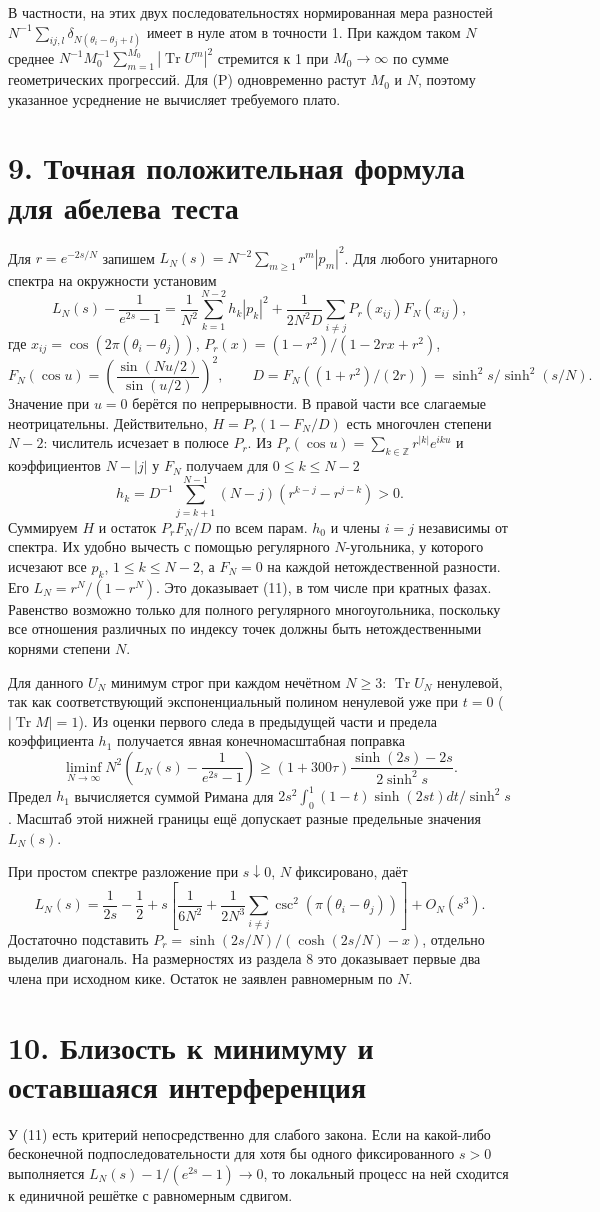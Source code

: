 \documentclass[11pt,a4paper]{article}
\newcommand{\Tr}{\operatorname{Tr}}
\newcommand{\Z}{\mathbb Z}
\newcommand{\sect}[1]{\section*{\sffamily\color{ink}#1}}
\begin{document}
В частности, на этих двух последовательностях нормированная мера разностей $N^{-1}\sum_{ij,l}\delta_{N(\theta_i-\theta_j+l)}$ имеет в нуле атом в точности 1. При каждом таком $N$ среднее $N^{-1}M_0^{-1}\sum_{m=1}^{M_0}|\Tr U^m|^2$ стремится к 1 при $M_0\to\infty$ по сумме геометрических прогрессий. Для (P) одновременно растут $M_0$ и $N$, поэтому указанное усреднение не вычисляет требуемого плато.
\newpage
\sect{9. Точная положительная формула для абелева теста}
Для $r=e^{-2s/N}$ запишем $L_N(s)=N^{-2}\sum_{m\ge1}r^m|p_m|^2$. Для любого унитарного спектра на окружности установим
\[
 L_N(s)-\frac1{e^{2s}-1}=\frac1{N^2}\sum_{k=1}^{N-2}h_k|p_k|^2
       +\frac1{2N^2D}\sum_{i\ne j}P_r(x_{ij})F_N(x_{ij}),                 \tag{11}
\]
где $x_{ij}=\cos(2\pi(\theta_i-\theta_j))$, $P_r(x)=(1-r^2)/(1-2rx+r^2)$,
\[
 F_N(\cos u)=\left(\frac{\sin(Nu/2)}{\sin(u/2)}\right)^2,\qquad
 D=F_N((1+r^2)/(2r))=\sinh^2 s/\sinh^2(s/N).
\]
Значение при $u=0$ берётся по непрерывности. В правой части все слагаемые неотрицательны. Действительно, $H=P_r(1-F_N/D)$ есть многочлен степени $N-2$: числитель исчезает в полюсе $P_r$. Из $P_r(\cos u)=\sum_{k\in\Z}r^{|k|}e^{iku}$ и коэффициентов $N-|j|$ у $F_N$ получаем для $0\le k\le N-2$
\[
       h_k=D^{-1}\sum_{j=k+1}^{N-1}(N-j)(r^{k-j}-r^{j-k})>0 .
\]
Суммируем $H$ и остаток $P_rF_N/D$ по всем парам. $h_0$ и члены $i=j$ независимы от спектра. Их удобно вычесть с помощью регулярного $N$-угольника, у которого исчезают все $p_k$, $1\le k\le N-2$, а $F_N=0$ на каждой нетождественной разности. Его $L_N=r^N/(1-r^N)$. Это доказывает (11), в том числе при кратных фазах. Равенство возможно только для полного регулярного многоугольника, поскольку все отношения различных по индексу точек должны быть нетождественными корнями степени $N$.

Для данного $U_N$ минимум строг при каждом нечётном $N\ge3$: $\Tr U_N$ ненулевой, так как соответствующий экспоненциальный полином ненулевой уже при $t=0$ ($|\Tr M|=1$). Из оценки первого следа в предыдущей части и предела коэффициента $h_1$ получается явная конечномасштабная поправка
\[
 \liminf_{N\to\infty} N^2\left(L_N(s)-\frac1{e^{2s}-1}\right)
 \ge (1+300\tau)\frac{\sinh(2s)-2s}{2\sinh^2s}.
\]
Предел $h_1$ вычисляется суммой Римана для $2s^2\int_0^1(1-t)\sinh(2st)dt/\sinh^2s$. Масштаб этой нижней границы ещё допускает разные предельные значения $L_N(s)$.

При простом спектре разложение при $s\downarrow0$, $N$ фиксировано, даёт
\[
 L_N(s)=\frac1{2s}-\frac12+
 s\left[\frac1{6N^2}+\frac1{2N^3}\sum_{i\ne j}\csc^2(\pi(\theta_i-\theta_j))\right]
 + O_N(s^3).
\]
Достаточно подставить $P_r=\sinh(2s/N)/(\cosh(2s/N)-x)$, отдельно выделив диагональ. На размерностях из раздела 8 это доказывает первые два члена при исходном кике. Остаток не заявлен равномерным по $N$.
\newpage
\sect{10. Близость к минимуму и оставшаяся интерференция}
У (11) есть критерий непосредственно для слабого закона. Если на какой-либо бесконечной подпоследовательности для хотя бы одного фиксированного $s>0$ выполняется $L_N(s)-1/(e^{2s}-1)\to0$, то локальный процесс на ней сходится к единичной решётке с равномерным сдвигом.
\end{document}
